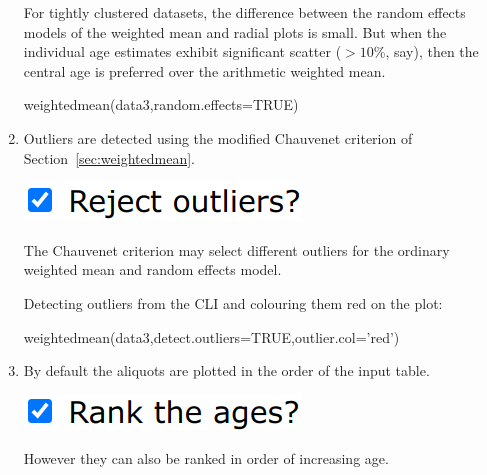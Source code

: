 \begin{refsection}
\begin{enumerate}
For tightly clustered datasets, the difference between the random
effects models of the weighted mean and radial plots is small.  But
when the individual age estimates exhibit significant scatter
($>10$\%, say), then the central age is preferred over the arithmetic
weighted mean.

\begin{console}
weightedmean(data3,random.effects=TRUE)
\end{console}
  
\item Outliers are detected using the modified Chauvenet criterion of
  Section~\ref{sec:weightedmean}.

\noindent\begin{minipage}[t]{.2\linewidth}
\strut\vspace*{-\baselineskip}\newline
  \includegraphics[width=\linewidth]{../figures/OtherWtdMeanOutliers.png}
\end{minipage}
\begin{minipage}[t]{.8\linewidth}
  The Chauvenet criterion may select different outliers for the
  ordinary weighted mean and random effects model.
\end{minipage}

Detecting outliers from the CLI and colouring them red on the plot:
\begin{console}
weightedmean(data3,detect.outliers=TRUE,outlier.col='red')
\end{console}

\item By default the aliquots are plotted in the order of the input
  table.

\noindent\begin{minipage}[t]{.2\linewidth}
\strut\vspace*{-\baselineskip}\newline
  \includegraphics[width=\linewidth]{../figures/OtherWtdMeanRank.png}
\end{minipage}
\begin{minipage}[t]{.8\linewidth}
However they can also be ranked in order of increasing age.
\end{minipage}


\end{enumerate}
\end{refsection}
